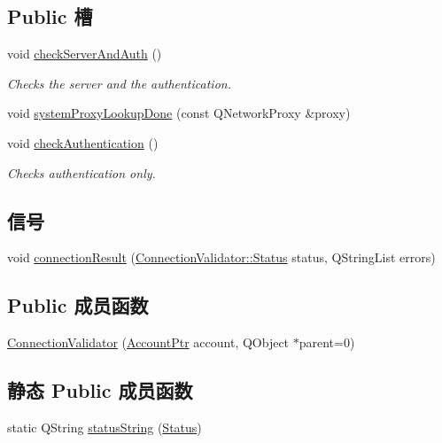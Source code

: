 \subsection*{Public 槽}
\begin{DoxyCompactItemize}
\item 
void \hyperlink{class_o_c_c_1_1_connection_validator_a89040a2500c82686d6e584eda2efd6e1}{check\+Server\+And\+Auth} ()
\begin{DoxyCompactList}\small\item\em Checks the server and the authentication. \end{DoxyCompactList}\item 
void \hyperlink{class_o_c_c_1_1_connection_validator_a502723c398e1656d4dd221eab152bd40}{system\+Proxy\+Lookup\+Done} (const Q\+Network\+Proxy \&proxy)
\item 
void \hyperlink{class_o_c_c_1_1_connection_validator_a3e8fe23c791f7b16be5ab0d93be3e26d}{check\+Authentication} ()
\begin{DoxyCompactList}\small\item\em Checks authentication only. \end{DoxyCompactList}\end{DoxyCompactItemize}
\subsection*{信号}
\begin{DoxyCompactItemize}
\item 
void \hyperlink{class_o_c_c_1_1_connection_validator_a5d88b8ad31fa61ce5f16a9ac0f005ff3}{connection\+Result} (\hyperlink{class_o_c_c_1_1_connection_validator_a8f1192e5d8ff687dbf93faf38af67f8b}{Connection\+Validator\+::\+Status} status, Q\+String\+List errors)
\end{DoxyCompactItemize}
\subsection*{Public 成员函数}
\begin{DoxyCompactItemize}
\item 
\hyperlink{class_o_c_c_1_1_connection_validator_a3c8ad64d60196900ad4bbd9d33557f06}{Connection\+Validator} (\hyperlink{namespace_o_c_c_a848616aedb9188e223c6b9867757fe69}{Account\+Ptr} account, Q\+Object $\ast$parent=0)
\end{DoxyCompactItemize}
\subsection*{静态 Public 成员函数}
\begin{DoxyCompactItemize}
\item 
static Q\+String \hyperlink{class_o_c_c_1_1_connection_validator_adbdebbfce49fb93c8752896eaf144617}{status\+String} (\hyperlink{class_o_c_c_1_1_connection_validator_a8f1192e5d8ff687dbf93faf38af67f8b}{Status})
\end{DoxyCompactItemize}
